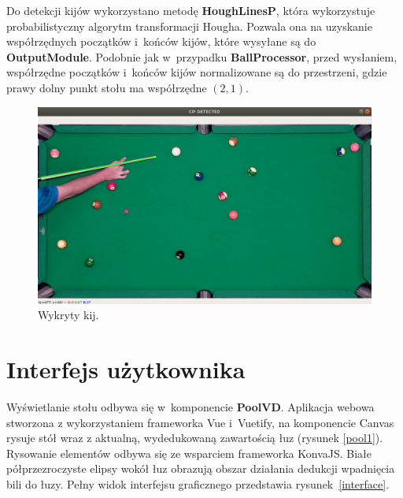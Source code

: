 \documentclass[12pt]{article}
\begin{document}
Do detekcji kijów wykorzystano metodę \textbf{HoughLinesP}\cite{HoughLinesP}, która wykorzystuje probabilistyczny algorytm transformacji Hougha\cite{ProbabilisticHoughTransform}. Pozwala ona na uzyskanie współrzędnych początków i~końców kijów, które wysyłane są do \textbf{OutputModule}. Podobnie jak w~przypadku \textbf{BallProcessor}, przed wysłaniem, współrzędne początków i~końców kijów normalizowane są do przestrzeni, gdzie prawy dolny punkt stołu ma współrzędne $(2, 1)$.

\begin{figure}[!htb]
    \centering
    \includegraphics[width=15cm]{./images/obrazki/cp/cue_detected.png}
    \caption{Wykryty kij.}
    \label{cue_detected}
\end{figure}

\FloatBarrier

\section{Interfejs użytkownika}

Wyświetlanie stołu odbywa się w~komponencie \textbf{PoolVD}. Aplikacja webowa stworzona z wykorzystaniem frameworka Vue i~Vuetify, na komponencie Canvas rysuje stół wraz z aktualną, wydedukowaną zawartością łuz (rysunek \ref{pool1}). Rysowanie elementów odbywa się ze wsparciem frameworka KonvaJS\cite{konva}. Białe półprzezroczyste elipsy wokół łuz obrazują obszar działania dedukcji wpadnięcia bili do łuzy. Pełny widok interfejsu graficznego przedstawia rysunek~\ref{interface}.
\end{document}
